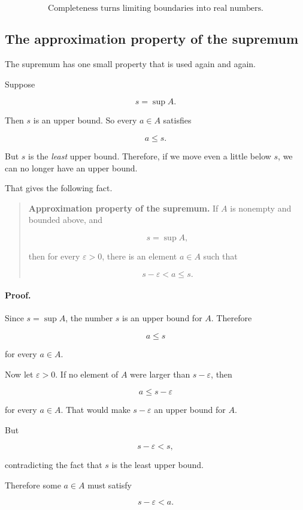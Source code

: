 \[
\boxed{
\text{Completeness turns limiting boundaries into real numbers.}
}
\]

\subsection{The approximation property of the supremum}
\label{appsubsec:supremum-approximation-property}

The supremum has one small property that is used again and again.

Suppose

\[
s=\sup A.
\]

Then \(s\) is an upper bound.  So every \(a\in A\) satisfies

\[
a\le s.
\]

But \(s\) is the \emph{least} upper bound.  Therefore, if we move even a little below
\(s\), we can no longer have an upper bound.

That gives the following fact.

\begin{quote}
\textbf{Approximation property of the supremum.}
If \(A\) is nonempty and bounded above, and

\[
s=\sup A,
\]

then for every \(\varepsilon>0\), there is an element \(a\in A\) such that

\[
s-\varepsilon<a\le s.
\]
\end{quote}

\paragraph{Proof.}
Since \(s=\sup A\), the number \(s\) is an upper bound for \(A\).  Therefore

\[
a\le s
\]

for every \(a\in A\).

Now let \(\varepsilon>0\).  If no element of \(A\) were larger than \(s-\varepsilon\), then

\[
a\le s-\varepsilon
\]

for every \(a\in A\).  That would make \(s-\varepsilon\) an upper bound for \(A\).

But

\[
s-\varepsilon<s,
\]

contradicting the fact that \(s\) is the least upper bound.

Therefore some \(a\in A\) must satisfy

\[
s-\varepsilon<a.
\]

